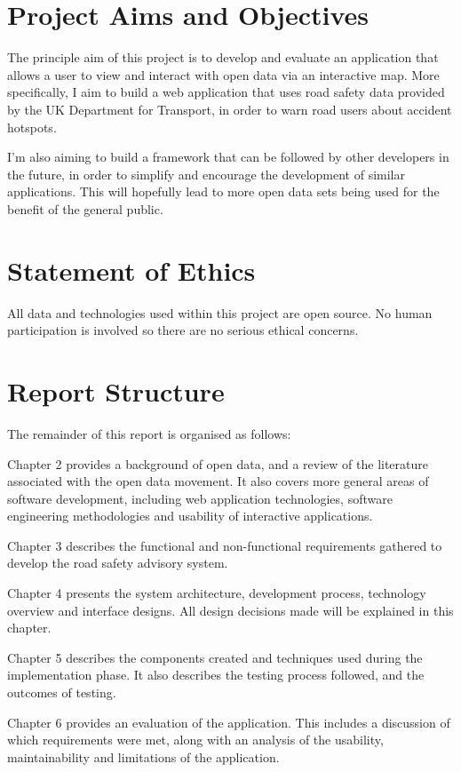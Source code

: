 \documentclass[authoryearcitations]{UoYCSproject}
\begin{document}
\section{Project Aims and Objectives}

The principle aim of this project is to develop and evaluate an application that allows a user to view and interact with open data via an interactive map. More specifically, I aim to build a web application that uses road safety data provided by the UK Department for Transport, in order to warn road users about accident hotspots.

I'm also aiming to build a framework that can be followed by other developers in the future, in order to simplify and encourage the development of similar applications. This will hopefully lead to more open data sets being used for the benefit of the general public.

\section{Statement of Ethics}

All data and technologies used within this project are open source. No human participation is involved so there are no serious ethical concerns.

\section{Report Structure}
The remainder of this report is organised as follows:

Chapter 2 provides a background of open data, and a review of the literature associated with the open data movement. It also covers more general areas of software development, including web application technologies, software engineering methodologies and usability of interactive applications.

Chapter 3 describes the functional and non-functional requirements gathered to develop the road safety advisory system.

Chapter 4 presents the system architecture, development process, technology overview and interface designs. All design decisions made will be explained in this chapter.

Chapter 5 describes the components created and techniques used during the implementation phase. It also describes the testing process followed, and the outcomes of testing.

Chapter 6 provides an evaluation of the application. This includes a discussion of which requirements were met, along with an analysis of the usability, maintainability and limitations of the application.
\end{document}
